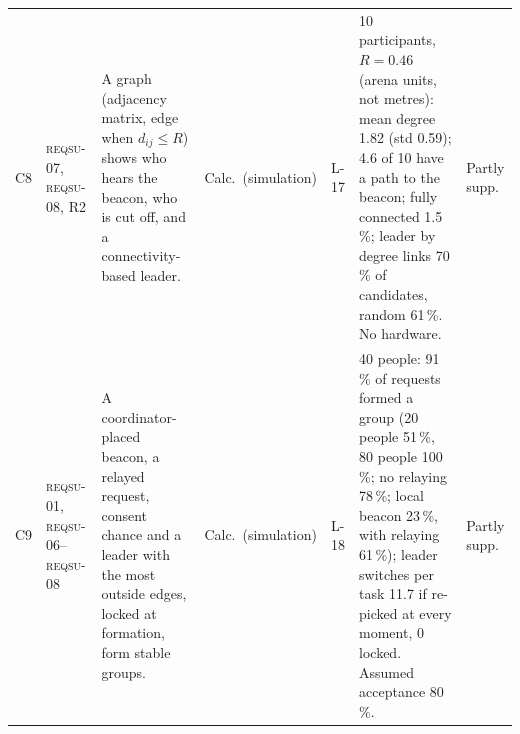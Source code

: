 \IfFileExists{IEEEtran.cls}{\documentclass[conference]{IEEEtran}}{\documentclass[10pt,twocolumn]{article}}
\newcommand{\req}[1]{\textsc{reqsu-}#1}
\begin{document}
\begin{table}[!t]
\begin{tabular}{@{}p{0.3in}p{0.62in}p{1.5in}p{0.6in}p{0.5in}p{2.1in}p{0.8in}@{}}
C8 & \req{07}, \req{08}, R2 & A graph (adjacency matrix, edge when $d_{ij}\le R$) shows who hears the beacon, who is cut off, and a connectivity-based leader. & Calc.\ (simulation) & L-17 & 10 participants, $R=0.46$ (arena units, not metres): mean degree 1.82 (std 0.59); 4.6 of 10 have a path to the beacon; fully connected 1.5\,\%; leader by degree links 70\,\% of candidates, random 61\,\%. No hardware. & Partly supp.\\
C9 & \req{01}, \req{06}--\req{08} & A coordinator-placed beacon, a relayed request, consent chance and a leader with the most outside edges, locked at formation, form stable groups. & Calc.\ (simulation) & L-18 & 40 people: 91\,\% of requests formed a group (20 people 51\,\%, 80 people 100\,\%; no relaying 78\,\%; local beacon 23\,\%, with relaying 61\,\%); leader switches per task 11.7 if re-picked at every moment, 0 locked. Assumed acceptance 80\,\%. & Partly supp.\\
\bottomrule
\end{tabular}

\end{table}
\end{document}
